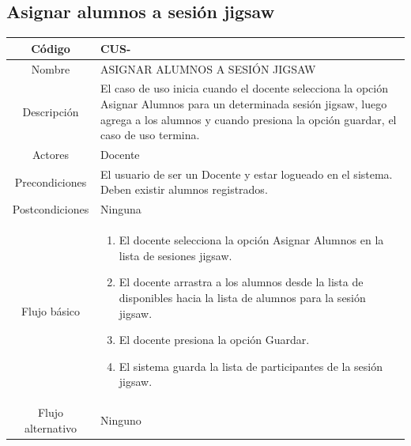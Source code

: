 \subsection{Asignar alumnos a sesión jigsaw}
\begin{longtable}{|c|L{10cm}|}
	\toprule[0.8mm]
	Código &  CUS-\casodeuso\\  \midrule
	Nombre &  ASIGNAR ALUMNOS A SESIÓN JIGSAW\\  \midrule
	Descripción &  El caso de uso inicia cuando el docente selecciona la opción Asignar Alumnos para un determinada sesión jigsaw, luego agrega a los alumnos y cuando presiona la opción guardar, el caso de uso termina.\\  \midrule
	Actores &  Docente\\  \midrule
	Precondiciones &  El usuario de ser un Docente y estar logueado en el sistema. Deben existir alumnos registrados.\\  \midrule
	Postcondiciones &  Ninguna\\  \midrule
	Flujo básico &    \begin{enumerate}
		\item El docente selecciona la opción Asignar Alumnos en la lista de sesiones jigsaw.
		\item El docente arrastra a los alumnos desde la lista de disponibles hacia la lista de alumnos para la sesión jigsaw.
		\item El docente presiona la opción Guardar.
		\item El sistema guarda la lista de participantes de la sesión jigsaw.
	\end{enumerate}  \\ \midrule
	Flujo alternativo & Ninguno \\  \bottomrule[0.8mm]
\end{longtable}
\clearpage
